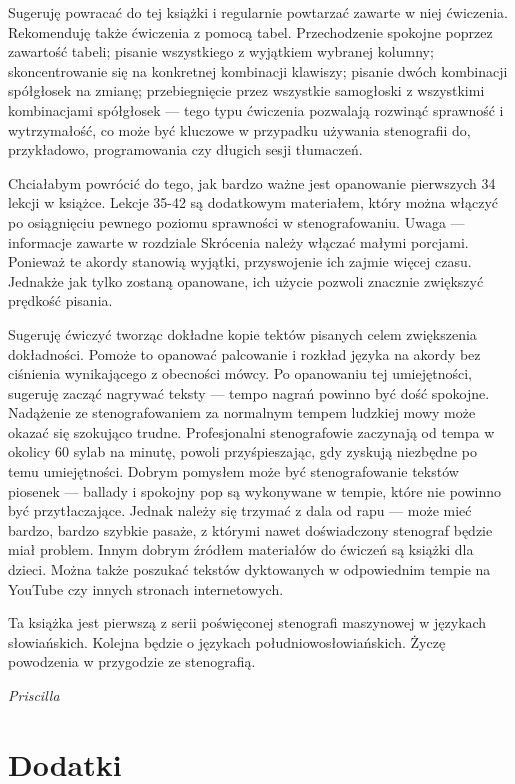 \documentclass[12p, oneside]{book}
\begin{document}
Sugeruję powracać do tej książki i regularnie powtarzać zawarte w niej ćwiczenia. Rekomenduję także ćwiczenia z pomocą tabel. Przechodzenie spokojne poprzez zawartość tabeli; pisanie wszystkiego z wyjątkiem wybranej kolumny; skoncentrowanie się na konkretnej kombinacji klawiszy; pisanie dwóch kombinacji spółgłosek na zmianę; przebiegnięcie przez wszystkie samogłoski z wszystkimi kombinacjami spółgłosek --- tego typu ćwiczenia pozwalają rozwinąć sprawność i wytrzymałość, co może być kluczowe w przypadku używania stenografii do, przykładowo, programowania czy długich sesji tłumaczeń.

Chciałabym powrócić do tego, jak bardzo ważne jest opanowanie pierwszych 34 lekcji w książce. Lekcje 35-42 są dodatkowym materiałem, który można włączyć po osiągnięciu pewnego poziomu sprawności w stenografowaniu. Uwaga --- informacje zawarte w rozdziale Skrócenia należy włączać małymi porcjami. Ponieważ te akordy stanowią wyjątki, przyswojenie ich zajmie więcej czasu. Jednakże jak tylko zostaną opanowane, ich użycie pozwoli znacznie zwiększyć prędkość pisania.

Sugeruję ćwiczyć tworząc dokładne kopie tektów pisanych celem zwiększenia dokładności. Pomoże to opanować palcowanie i rozkład języka na akordy bez ciśnienia wynikającego z obecności mówcy. Po opanowaniu tej umiejętności, sugeruję zacząć nagrywać teksty --- tempo nagrań powinno być dość spokojne. Nadążenie ze stenografowaniem za normalnym tempem ludzkiej mowy może okazać się szokująco trudne. Profesjonalni stenografowie zaczynają od tempa w okolicy 60 sylab na minutę, powoli przyśpieszając, gdy zyskują niezbędne po temu umiejętności. Dobrym pomysłem może być stenografowanie tekstów piosenek --- ballady i spokojny pop są wykonywane w tempie, które nie powinno być przytłaczające. Jednak należy się trzymać z dala od rapu --- może mieć bardzo, bardzo szybkie pasaże, z którymi nawet doświadczony stenograf będzie miał problem. Innym dobrym źródłem materiałów do ćwiczeń są książki dla dzieci. Można także poszukać tekstów dyktowanych w odpowiednim tempie na YouTube czy innych stronach internetowych.


Ta książka jest pierwszą z serii poświęconej stenografi maszynowej w językach słowiańskich. Kolejna będzie o językach południowosłowiańskich. Życzę powodzenia w przygodzie ze stenografią.

{\em Priscilla}
\appendix
\chapter{Dodatki}
\end{document}
